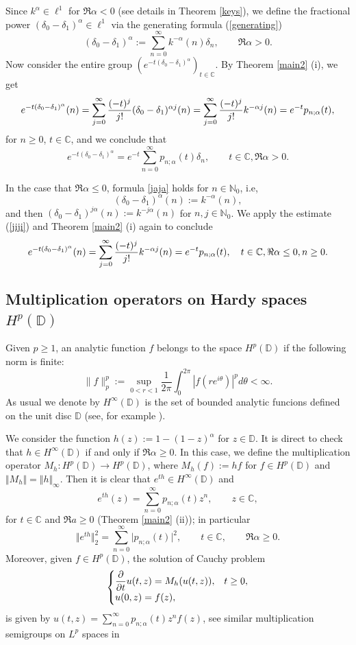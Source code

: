 \documentclass[a4paper,12pt]{amsart}
\def\NN{\mathbb N}
\def\CC{\mathbb C}
\def\CC{\mathbb C}
\def\DD{\mathbb D}
\theoremstyle{definition}
\theoremstyle{remark}
\begin{document}
 Since $k^\alpha\in \ell^1$ for $\Re \alpha <0$ (see details in Theorem \ref{keys}), we  define the fractional power $(\delta_0-\delta_1)^{\alpha}\in \ell^1$ via the  generating formula (\ref{generating})
\begin{equation}\label{jaja}
(\delta_0-\delta_1)^{\alpha}:=\sum_{n=0}^{\infty}k^{-\alpha}(n)\delta_n, \qquad \Re \alpha >0.
\end{equation}
Now consider the entire group $(e^{-t(\delta_0-\delta_1)^{\alpha}})_{t\in \CC}$. By Theorem \ref{main2} (i), we get
$$
e^{-t(\delta_0-\delta_1)^{\alpha}}(n)= \sum_{j=0}^\infty{(-t)^j\over j!}(\delta_0-\delta_1)^{\alpha j}(n)=
\sum_{j=0}^\infty{(-t)^j\over j!}k^{-\alpha j}(n)=e^{-t} p_{n;\alpha}(t),
$$
for $n\ge 0$, $t\in \CC $, and we conclude that
$$
e^{-t(\delta_0-\delta_1)^\alpha}=e^{-t} \sum_{n=0}^\infty p_{n;\alpha}(t)\delta_n, \qquad t\in \CC, \Re \alpha>0.
$$

In the case that $\Re \alpha\le 0$, formula \ref{jaja} holds for $n\in \NN_0$, i.e,
$$
(\delta_0-\delta_1)^{\alpha}(n):=k^{-\alpha}(n),
$$
and then $(\delta_0-\delta_1)^{j\alpha}(n):=k^{-j\alpha}(n)$  for $n,j\in \NN_0$. We  apply the estimate (\ref{jiji}) and  Theorem \ref{main2} (i) again to conclude
$$
e^{-t(\delta_0-\delta_1)^{\alpha}}(n)=
\sum_{j=0}^\infty{(-t)^j\over j!}k^{-\alpha j}(n)=e^{-t} p_{n;\alpha}(t), \quad t\in \CC, \Re \alpha\le 0, n\ge 0.
$$


\subsection{ Multiplication operators on Hardy spaces $H^p(\DD)$}\label{multi}

Given $p\ge 1$, an analytic function $f$ belongs to the space $H^p(\mathbb{D})$ if the following norm is finite:
\[ \|f\|_p^p := \sup_{0 < r < 1} \frac{1}{2\pi} \int_0^{2\pi} |f(r e^{i\theta})|^p d\theta < \infty. \]
As usual we denote by $H^\infty(\mathbb{D})$ is the set of  bounded analytic funcions defined on the unit disc $\DD$ (see, for example \cite[Chapter 17]{rudin}).




We consider the function $h(z):=1-(1-z)^\alpha$  for $z\in \DD$. It is direct to check that $h \in H^\infty(\mathbb{D}) $ if and only if $\Re \alpha \ge 0$. In this case, we define the multiplication operator $M_h:H^p(\mathbb{D}) \to H^p(\mathbb{D})$, where $M_h(f):=hf$ for $f\in H^p(\mathbb{D})$ and $\Vert M_h\Vert= \Vert h \Vert_\infty$. Then it is clear that
$e^{th}\in H^\infty(\mathbb{D})$ and
$$
e^{th}(z)=\displaystyle\sum_{n=0}^\infty p_{n;\alpha}(t)z^n, \qquad z\in \CC,
$$
for $t\in \CC$ and $\Re a\ge 0$ (Theorem \ref{main2} (ii)); in particular
$$
\Vert e^{th}\Vert_2^2=\sum_{n=0}^\infty \vert p_{n;\alpha}(t)\vert^2, \qquad t\in \CC, \qquad \Re\alpha \ge 0.
$$
Moreover, given $f\in H^p(\DD)$, the solution of Cauchy problem
$$
\begin{cases}
\displaystyle{\partial \over \partial t} u(t,z)=M_h(u(t
,z)), &  t\ge 0, \\
u(0,z)=f(z) , &
\end{cases}
$$
is given by $u(t,z)=\displaystyle\sum_{n=0}^\infty p_{n;\alpha}(t)z^n f(z)$, see similar multiplication semigroups on $L^p$ spaces in  \cite[Section I.4]{En-Na-00}
\end{document}
